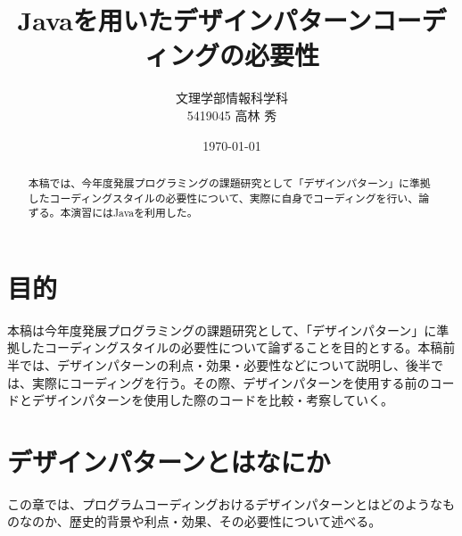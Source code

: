 \documentclass[dvipdfmx]{jsarticle}
\title{Javaを用いたデザインパターンコーディングの必要性}
\author{文理学部情報科学科\\5419045 高林 秀}
\date{\today}
\begin{document}
\maketitle

\begin{abstract}
本稿では、今年度発展プログラミングの課題研究として「デザインパターン」に準拠したコーディングスタイルの必要性について、実際に自身でコーディングを行い、論ずる。本演習にはJavaを利用した。
\end{abstract}

\section{目的}
本稿は今年度発展プログラミングの課題研究として、「デザインパターン」に準拠したコーディングスタイルの必要性について論ずることを目的とする。本稿前半では、デザインパターンの利点・効果・必要性などについて説明し、後半では、実際にコーディングを行う。その際、デザインパターンを使用する前のコードとデザインパターンを使用した際のコードを比較・考察していく。
\section{デザインパターンとはなにか}
この章では、プログラムコーディングおけるデザインパターンとはどのようなものなのか、歴史的背景や利点・効果、その必要性について述べる。\par
\end{document}
